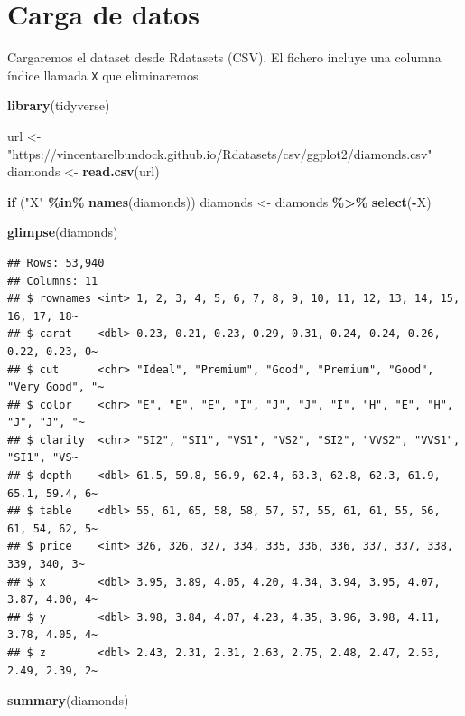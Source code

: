 \documentclass[
  spanish,
]{article}
\newenvironment{Shaded}{\begin{snugshade}}{\end{snugshade}}
\newcommand{\ControlFlowTok}[1]{\textcolor[rgb]{0.13,0.29,0.53}{\textbf{#1}}}
\newcommand{\FunctionTok}[1]{\textcolor[rgb]{0.13,0.29,0.53}{\textbf{#1}}}
\newcommand{\NormalTok}[1]{#1}
\newcommand{\OtherTok}[1]{\textcolor[rgb]{0.56,0.35,0.01}{#1}}
\newcommand{\SpecialCharTok}[1]{\textcolor[rgb]{0.81,0.36,0.00}{\textbf{#1}}}
\newcommand{\StringTok}[1]{\textcolor[rgb]{0.31,0.60,0.02}{#1}}
\begin{document}
\section{Carga de datos}\label{carga-de-datos}

Cargaremos el dataset desde Rdatasets (CSV). El fichero incluye una
columna índice llamada \texttt{X} que eliminaremos.

\begin{Shaded}
\begin{Highlighting}[]
\FunctionTok{library}\NormalTok{(tidyverse)}

\NormalTok{url }\OtherTok{\textless{}{-}} \StringTok{"https://vincentarelbundock.github.io/Rdatasets/csv/ggplot2/diamonds.csv"}
\NormalTok{diamonds }\OtherTok{\textless{}{-}} \FunctionTok{read.csv}\NormalTok{(url)}

\ControlFlowTok{if}\NormalTok{ (}\StringTok{"X"} \SpecialCharTok{\%in\%} \FunctionTok{names}\NormalTok{(diamonds)) diamonds }\OtherTok{\textless{}{-}}\NormalTok{ diamonds }\SpecialCharTok{\%\textgreater{}\%} \FunctionTok{select}\NormalTok{(}\SpecialCharTok{{-}}\NormalTok{X)}

\FunctionTok{glimpse}\NormalTok{(diamonds)}
\end{Highlighting}
\end{Shaded}

\begin{verbatim}
## Rows: 53,940
## Columns: 11
## $ rownames <int> 1, 2, 3, 4, 5, 6, 7, 8, 9, 10, 11, 12, 13, 14, 15, 16, 17, 18~
## $ carat    <dbl> 0.23, 0.21, 0.23, 0.29, 0.31, 0.24, 0.24, 0.26, 0.22, 0.23, 0~
## $ cut      <chr> "Ideal", "Premium", "Good", "Premium", "Good", "Very Good", "~
## $ color    <chr> "E", "E", "E", "I", "J", "J", "I", "H", "E", "H", "J", "J", "~
## $ clarity  <chr> "SI2", "SI1", "VS1", "VS2", "SI2", "VVS2", "VVS1", "SI1", "VS~
## $ depth    <dbl> 61.5, 59.8, 56.9, 62.4, 63.3, 62.8, 62.3, 61.9, 65.1, 59.4, 6~
## $ table    <dbl> 55, 61, 65, 58, 58, 57, 57, 55, 61, 61, 55, 56, 61, 54, 62, 5~
## $ price    <int> 326, 326, 327, 334, 335, 336, 336, 337, 337, 338, 339, 340, 3~
## $ x        <dbl> 3.95, 3.89, 4.05, 4.20, 4.34, 3.94, 3.95, 4.07, 3.87, 4.00, 4~
## $ y        <dbl> 3.98, 3.84, 4.07, 4.23, 4.35, 3.96, 3.98, 4.11, 3.78, 4.05, 4~
## $ z        <dbl> 2.43, 2.31, 2.31, 2.63, 2.75, 2.48, 2.47, 2.53, 2.49, 2.39, 2~
\end{verbatim}

\begin{Shaded}
\begin{Highlighting}[]
\FunctionTok{summary}\NormalTok{(diamonds)}
\end{Highlighting}
\end{Shaded}
\end{document}
